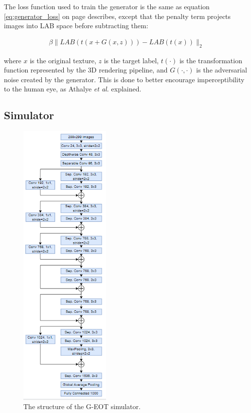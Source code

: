 The loss function used to train the generator is the same as equation \ref{eq:generator_loss} on page \pageref{eq:generator_loss} describes, except that the penalty term projects images into LAB space before subtracting them:

\begin{equation}
    \begin{aligned}
    \beta\|LAB(t(x + G(x,z))) - LAB(t(x))\|_2
    \end{aligned}
\end{equation}

\noindent where $x$ is the original texture, $z$ is the target label, $t(\cdot)$ is the transformation function represented by the 3D rendering pipeline, and $G(\cdot, \cdot)$ is the adversarial noise created by the generator. This is done to better encourage imperceptibility to the human eye, as Athalye \textit{et al.} explained.

\subsection{Simulator}

\begin{figure}
    \centering
    \includegraphics[width=0.4\textwidth]{graphics/g_eot_simulator.PNG}
    \caption{The structure of the G-EOT simulator.}
    \label{fig:proposed_simulator}
\end{figure}

